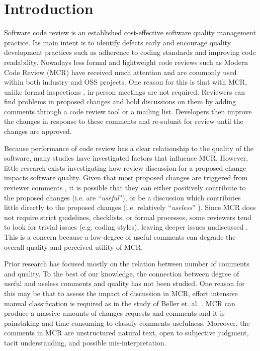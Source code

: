 
\section{Introduction}
Software code review is an established cost-effective software quality management practice.
Its main intent is to  identify  defects early and encourage quality development practices such as adherence to coding standards and improving code readability.
Nowadays less formal and lightweight code reviews such as Modern Code Review (MCR)\cite{Bacchelli2013a} have received much attention and are commonly used within both industry and OSS projects.
One reason for this is that with MCR, unlike formal inspections \cite{Fagan:1976:DCI:1661010.1661012}, in-person meetings are not required.
Reviewers can find problems in proposed changes and hold discussions on them by adding comments through a code review tool or a mailing list.
Developers then improve the changes in response to these comments and re-submit for review until the changes are approved.  

Because performance of code review has a clear relationship to the quality of the software, many studies have investigated factors that influence MCR\cite{Baysal2001,Mcintosh,Beller,Hamasaki2013}.
However, little research exists investigating how review discussion for a proposed change impacts software quality.
Given that most proposed changes are triggered from reviewer comments \cite{Beller}, 
it is possible that they can either positively contribute to the proposed changes (i.e. are ``\emph{useful}''), or be a discussion which contributes little directly to the proposed changes (i.e. relatively ``\emph{useless}'' ). 
Since MCR does not require strict guidelines, checklists, or formal processes, some reviewers tend to look for trivial issues (e.g. coding styles), leaving deeper issues undiscussed \cite{Bacchelli2013a}.
This is a concern because a low-degree of useful comments can degrade the overall quality and perceived utility of MCR.

Prior research has focused mostly on the relation between number of comments and quality.
To the best of our knowledge, the connection between degree of useful and useless comments and quality has not been studied.
One reason for this may be that to assess the impact of discussion in MCR, effort intensive manual classification is required as in the study of Beller et. al. \cite{Beller}.
MCR can produce a massive amounts of changes requests and comments\cite{Balachandran2013,Thongtanunam2014} and it is painstaking and time consuming to classify comments usefulness.
Moreover, the comments in MCR are unstructured natural text, open to subjective judgment, tacit understanding, and possible mis-interpretation. 



